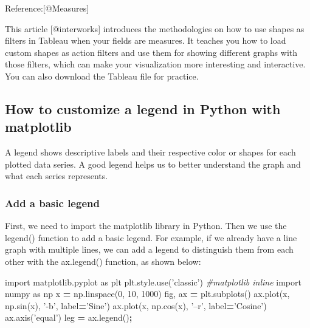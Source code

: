 \documentclass[]{book}
\newenvironment{Shaded}{\begin{snugshade}}{\end{snugshade}}
\newcommand{\DecValTok}[1]{\textcolor[rgb]{0.00,0.00,0.81}{#1}}
\newcommand{\StringTok}[1]{\textcolor[rgb]{0.31,0.60,0.02}{#1}}
\newcommand{\ImportTok}[1]{#1}
\newcommand{\CommentTok}[1]{\textcolor[rgb]{0.56,0.35,0.01}{\textit{#1}}}
\newcommand{\OperatorTok}[1]{\textcolor[rgb]{0.81,0.36,0.00}{\textbf{#1}}}
\newcommand{\NormalTok}[1]{#1}
\theoremstyle{definition}
\theoremstyle{definition}
\theoremstyle{definition}
\theoremstyle{remark}
\begin{document}
Reference:{[}@Measures{]}

This article {[}@interworks{]} introduces the methodologies on how to
use shapes as filters in Tableau when your fields are measures. It
teaches you how to load custom shapes as action filters and use them for
showing different graphs with those filters, which can make your
visualization more interesting and interactive. You can also download
the Tableau file for practice.

\subsection{How to customize a legend in Python with
matplotlib}\label{how-to-customize-a-legend-in-python-with-matplotlib}

A legend shows descriptive labels and their respective color or shapes
for each plotted data series. A good legend helps us to better
understand the graph and what each series represents.

\subsubsection{Add a basic legend}\label{add-a-basic-legend}

First, we need to import the matplotlib library in Python. Then we use
the legend() function to add a basic legend. For example, if we already
have a line graph with multiple lines, we can add a legend to
distinguish them from each other with the ax.legend() function, as shown
below:

\begin{Shaded}
\begin{Highlighting}[]
\ImportTok{import}\NormalTok{ matplotlib.pyplot }\ImportTok{as}\NormalTok{ plt}
\NormalTok{plt.style.use(}\StringTok{'classic'}\NormalTok{)}
\CommentTok{#matplotlib inline}
\ImportTok{import}\NormalTok{ numpy }\ImportTok{as}\NormalTok{ np}
\NormalTok{x }\OperatorTok{=}\NormalTok{ np.linspace(}\DecValTok{0}\NormalTok{, }\DecValTok{10}\NormalTok{, }\DecValTok{1000}\NormalTok{)}
\NormalTok{fig, ax }\OperatorTok{=}\NormalTok{ plt.subplots()}
\NormalTok{ax.plot(x, np.sin(x), }\StringTok{'-b'}\NormalTok{, label}\OperatorTok{=}\StringTok{'Sine'}\NormalTok{)}
\NormalTok{ax.plot(x, np.cos(x), }\StringTok{'--r'}\NormalTok{, label}\OperatorTok{=}\StringTok{'Cosine'}\NormalTok{)}
\NormalTok{ax.axis(}\StringTok{'equal'}\NormalTok{)}
\NormalTok{leg }\OperatorTok{=}\NormalTok{ ax.legend()}\OperatorTok{;}
\end{Highlighting}
\end{Shaded}
\end{document}
